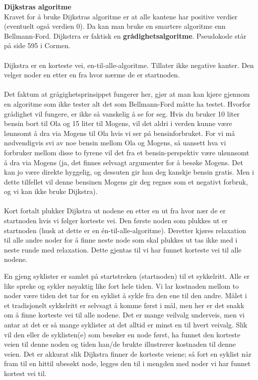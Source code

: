\noindent\textbf{Dijkstras algoritme}\\
Kravet for å bruke Dijkstras algoritme er at alle kantene har positive verdier (eventuelt også verdien 0). Da kan man bruke en smartere algoritme enn Bellmann-Ford. Dijkstrra er faktisk en \textbf{grådighetsalgoritme}. Pseudokode står på side 595 i Cormen.
\\\\
Dijkstra er en korteste vei, en-til-alle-algoritme. Tillater ikke negative kanter. Den velger noder en etter en fra hvor nærme de er startnoden. 
\\\\
Det faktum at grågighetsprinsippet fungerer her, gjør at man kan kjøre gjennom en algoritme som ikke tester alt det som Bellmann-Ford måtte ha testet. Hvorfor grådighet vil fungere, er ikke så vanskelig å se for seg. Hvis du bruker 10 liter bensin bort til Ola og 15 liter til Mogens, vil det aldri i verden kunne være lønnsomt å dra via Mogens til Ola hvis vi ser på bensinforbruket. For vi må nødvendigvis svi av noe bensin mellom Ola og Mogens, så uansett hva vi forbruker mellom disse to fyrene vil det fra et bensin-perspektiv være ulønnsomt å dra via Mogens (ja, det finnes selvsagt argumenter for å besøke Mogens. Det kan jo være direkte hyggelig, og dessuten gir han deg kanskje bensin gratis. Men i dette tilfellet vil denne bensinen Mogens gir deg regnes som et negativt forbruk, og vi kan ikke bruke Dijkstra).
\\\\
Kort fortalt plukker Dijkstra ut nodene en etter en ut fra hvor nær de er startnoden hvis vi følger korteste vei. Den første noden som plukkes ut er startnoden (husk at dette er en én-til-alle-algoritme). Deretter kjøres relaxation til alle andre noder for å finne neste node som skal plukkes ut tas ikke med i neste runde med relaxation. Dette gjentas til vi har funnet korteste vei til alle nodene. 

\begin{boxed}
En gjeng syklister er samlet på startstreken (startnoden) til et sykkelritt. Alle er like spreke og sykler nøyaktig like fort hele tiden. Vi lar kostnaden mellom to noder være tiden det tar for en syklist å sykle fra den ene til den andre. Målet i et tradisjonelt sykkelritt er selvsagt å komme først i mål, men her er det snakk om å finne korteste vei til alle nodene.\newline\newline
Det er mange veilvalg underveis, men vi antar at det er så mange syklister at det alltid er minst en til hvert veivalg. Slik vil den eller de syklisten(e) som besøker en node først, ha funnet den korteste veien til denne noden og tiden han/de brukte illustrerer kostnaden til denne veien.
\newline\newline
Det er akkurat slik Dijkstra finner de korteste veiene; så fort en syklist når fram til en hittil ubesøkt node, legges den til i mengden med noder vi har funnet kortest vei til.
\end{boxed}

